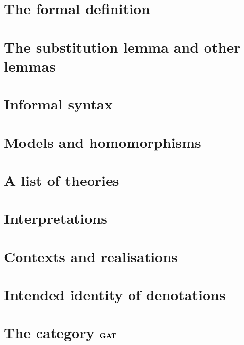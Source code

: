 \section{The formal definition} \label{sec:source-1-6}

\lipsum[5]

\section{The substitution lemma and other lemmas} \label{sec:source-1-7}

\lipsum[6]

\section{Informal syntax} \label{sec:source-1-8}

\lipsum[7]

\section{Models and homomorphisms} \label{sec:source-1-9}

\lipsum[8]

\section{A list of theories} \label{sec:source-1-10}

\lipsum[9]

\section{Interpretations} \label{sec:source-1-11}

\lipsum[10]

\section{Contexts and realisations} \label{sec:source-1-12}

\lipsum[11]

\section{Intended identity of denotations} \label{sec:source-1-13}

\lipsum[12]

\section{The category $\mathbf{GAT}$} \label{sec:source-1-14}

\lipsum[13]

